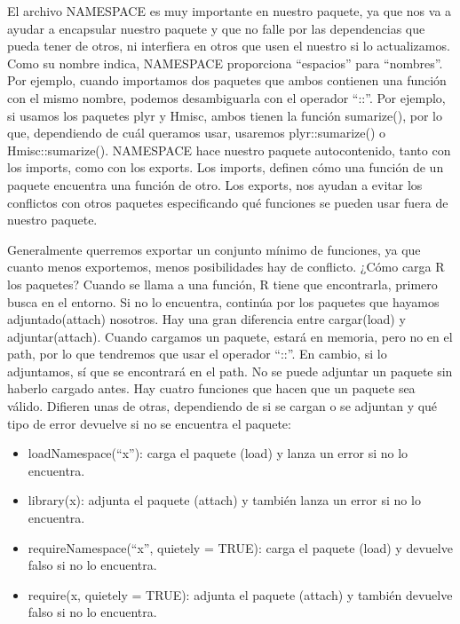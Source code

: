 El archivo NAMESPACE es muy importante en nuestro paquete, ya que nos va a ayudar a
encapsular nuestro paquete y que no falle por las dependencias que pueda tener de otros, ni
interfiera en otros que usen el nuestro si lo actualizamos.
Como su nombre indica, NAMESPACE proporciona “espacios” para “nombres”. Por ejemplo,
cuando importamos dos paquetes que ambos contienen una funci\'on con el mismo nombre,
podemos desambiguarla con el operador “::”. Por ejemplo, si usamos los paquetes plyr y
Hmisc, ambos tienen la funci\'on sumarize(), por lo que, dependiendo de cu\'al queramos usar,
usaremos plyr::sumarize() o Hmisc::sumarize().
NAMESPACE hace nuestro paquete autocontenido, tanto con los imports, como con los
exports. Los imports, definen c\'omo una funci\'on de un paquete encuentra una funci\'on de
otro. Los exports, nos ayudan a evitar los conflictos con otros paquetes especificando qu\'e
funciones se pueden usar fuera de nuestro paquete.

Generalmente querremos exportar un conjunto m\'inimo de funciones, ya que cuanto menos
exportemos, menos posibilidades hay de conflicto.
¿C\'omo carga R los paquetes?
Cuando se llama a una funci\'on, R tiene que encontrarla, primero busca en el entorno. Si no
lo encuentra, contin\'ua por los paquetes que hayamos adjuntado(attach) nosotros.
Hay una gran diferencia entre cargar(load) y adjuntar(attach).
Cuando cargamos un paquete, estar\'a en memoria, pero no en el path, por lo que tendremos
que usar el operador “::”. En cambio, si lo adjuntamos, s\'i que se encontrar\'a en el path. No
se puede adjuntar un paquete sin haberlo cargado antes.
Hay cuatro funciones que hacen que un paquete sea v\'alido. Difieren unas de otras,
dependiendo de si se cargan o se adjuntan y qu\'e tipo de error devuelve si no se encuentra el
paquete:

\begin{itemize}
    \item loadNamespace(“x”): carga el paquete (load) y lanza un error si no lo encuentra.
    \item library(x): adjunta el paquete (attach) y tambi\'en lanza un error si no lo encuentra.
    \item requireNamespace(“x”, quietely = TRUE): carga el paquete (load) y devuelve falso
si no lo encuentra.
    \item require(x, quietely = TRUE): adjunta el paquete (attach) y tambi\'en devuelve falso si
no lo encuentra.
\end{itemize}

